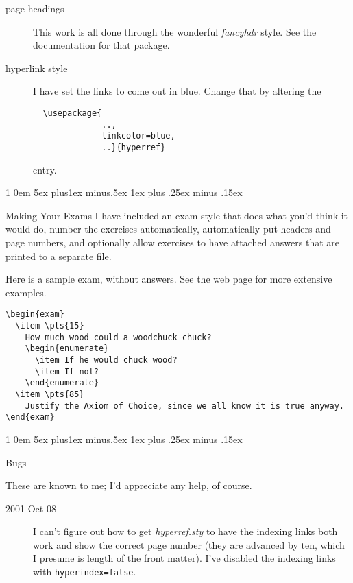 \documentclass[titlepage]{article}
\makeatletter
\renewcommand{\section}{\@startsection{section}%
  {1}%
  {0em}%
  {5ex plus1ex minus.5ex}%
  {1ex plus .25ex minus .15ex}%
  {\Large\bfseries\raggedright}}
\makeatother
\begin{document}
\begin{description}
  \item[page headings]
    This work is all done through the wonderful \textit{fancyhdr} style.
    See the documentation for that package.

  \item[hyperlink style]
    I have set the links to come out in blue.
    Change that by altering the 
\begin{verbatim}
  \usepackage{
              ..,
              linkcolor=blue,
              ..}{hyperref}
\end{verbatim}
    entry.


\end{description}



\section{Making Your Exams}
I have included an exam style that does what you'd think it would do,
number the exercises automatically, automatically put headers and page
numbers, and optionally allow exercises to have attached answers that are
printed to a separate file.  

Here is a sample exam, without answers.
See the web page for more extensive examples.

\begin{verbatim}
\begin{exam}
  \item \pts{15}
    How much wood could a woodchuck chuck?
    \begin{enumerate}
      \item If he would chuck wood?
      \item If not?
    \end{enumerate}
  \item \pts{85}
    Justify the Axiom of Choice, since we all know it is true anyway.
\end{exam}
\end{verbatim}


\section{Bugs}

These are known to me; I'd appreciate any help, of course.
\begin{description}
  \item[2001-Oct-08]
    I can't figure out how to get \textit{hyperref.sty} to 
    have the indexing links both work and show the correct page number
    (they are advanced by ten, which I presume is length of the front matter).
    I've disabled the indexing links with \verb!hyperindex=false!. 
\end{description}
\end{document}
